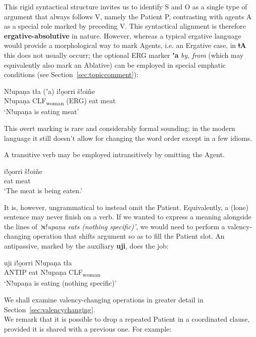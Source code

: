 \documentclass[11pt,a5paper]{book}
\newcommand{\qcn}[1]{\textcolor{AccentText}{\large\textbf{#1}}}
\newcommand{\langname}{\qcn{ǂA}}
\newcommand{\transl}[2]{\qcn{#1} \emph{#2}}
\newcommand{\grammsc}[1]{\textsc{#1}}
\newcommand{\CLF}[1]{\grammsc{CLF}\textsubscript{#1}}
\newcommand{\ERG}{\grammsc{ERG}}
\begin{document}
This rigid syntactical structure invites us to identify S and O as a single type of argument that always follows V, namely the Patient P, contrasting with agents A as a special role marked by preceding V. This syntactical alignment is therefore \textbf{ergative-absolutive} in nature. However, whereas a typical ergative language would provide a morphological way to mark Agents, i.e. an Ergative case, in \langname{} this does not usually occurr; the optional \ERG{} marker \transl{ʼa}{by, from} (which may equivalently also mark an Ablative) can be employed in special emphatic conditions (see Section~\ref{sec:topiccomment}):

\begin{exe}
	\ex
	\gll Nǃupaṇa 	tła  (ʼa)	iǃo̰orri  	šǃoiñe \\
		Nǃupaṇa 	\CLF{woman} (\ERG) 	eat 	meat\\
	\glt `Nǃupaṇa is eating meat'
\end{exe}

This overt marking is rare and considerably formal sounding; in the modern language it still doesn't allow for changing the word order except in a few idioms.

A transitive verb may be employed intransitively by omitting the Agent.

\begin{exe}
	\ex
	\gll iǃo̰orri 	šǃoiñe\\
eat 	meat\\
\glt `The meat is being eaten.'
\end{exe}

It is, however, ungrammatical to instead omit the Patient. Equivalently, a (lone) sentence may never finish on a verb. If we wanted to express a meaning alongside the lines of \emph{`ɴǃupaṇa eats (nothing specific)'}, we would need to perform a valency-changing operation that shifts argument so as to fill the Patient slot. An antipassive, marked by the auxiliary \qcn{uji}, does the job:

\begin{exe}
	\ex
	\gll  uji 	iǃo̰orri Nǃupaṇa 	tła  \\
	ANTIP eat	Nǃupaṇa 	\CLF{woman} 	\\
	\glt `Nǃupaṇa is eating (nothing specific)'
\end{exe}

We shall examine valency-changing operations in greater detail in Section~\ref{sec:valencychanging}.\\

We remark that it is possible to drop a repeated Patient in a coordinated clause, provided it is shared with a previous one. For example:
\end{document}
